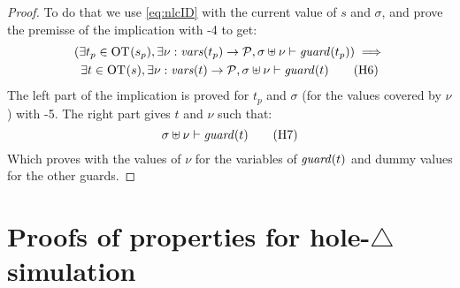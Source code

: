 \documentclass{article}
\begin{document}
\begin{proof}
	To do that we use \eqref{eq:nlcID} with the current value of \(s\) and \(\sigma\), and prove the premisse of the implication with \hyp{4} to get:
	\begin{multline}
		\mpar{\exists t_p \in \fOT{s_p}, \exists \nu: \fvars{t_p} \to \values, \sigma \uplus \nu \vdash \fguard{t_p}} \implies \\
		\exists t \in \fOT{s}, \exists \nu: \fvars{t} \to \values, \sigma \uplus \nu \vdash \fguard{t} \hyp{6}
	\end{multline}
	The left part of the implication is proved for \(t_p\) and \(\sigma\) (for the values covered by \(\nu\)) with \hyp{5}.
	The right part gives \(t\) and \(\nu\) such that:
	\[ \sigma \uplus \nu \vdash \fguard{t} \hyp{7} \]
	Which proves  with the values of \(\nu\) for the variables of \(\mathit{guard}{\left(t\right)}\) and dummy values for the other guards.
\end{proof}


\section{Proofs of properties for hole-\(\triangle\) simulation}
\end{document}
